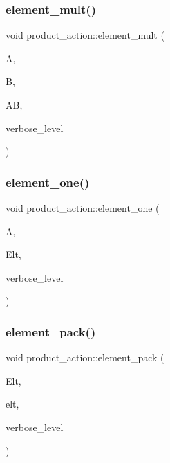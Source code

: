 \subsubsection{\texorpdfstring{element\+\_\+mult()}{element\_mult()}}
{\footnotesize\ttfamily void product\+\_\+action\+::element\+\_\+mult (\begin{DoxyParamCaption}\item[{\mbox{\hyperlink{galois_8h_a09fddde158a3a20bd2dcadb609de11dc}{I\+NT}} $\ast$}]{A,  }\item[{\mbox{\hyperlink{galois_8h_a09fddde158a3a20bd2dcadb609de11dc}{I\+NT}} $\ast$}]{B,  }\item[{\mbox{\hyperlink{galois_8h_a09fddde158a3a20bd2dcadb609de11dc}{I\+NT}} $\ast$}]{AB,  }\item[{\mbox{\hyperlink{galois_8h_a09fddde158a3a20bd2dcadb609de11dc}{I\+NT}}}]{verbose\+\_\+level }\end{DoxyParamCaption})}

\mbox{\label{classproduct__action_a3b367662c854bb83763d5347c193f203}} 
\subsubsection{\texorpdfstring{element\+\_\+one()}{element\_one()}}
{\footnotesize\ttfamily void product\+\_\+action\+::element\+\_\+one (\begin{DoxyParamCaption}\item[{\mbox{\hyperlink{classaction}{action}} $\ast$}]{A,  }\item[{\mbox{\hyperlink{galois_8h_a09fddde158a3a20bd2dcadb609de11dc}{I\+NT}} $\ast$}]{Elt,  }\item[{\mbox{\hyperlink{galois_8h_a09fddde158a3a20bd2dcadb609de11dc}{I\+NT}}}]{verbose\+\_\+level }\end{DoxyParamCaption})}

\mbox{\label{classproduct__action_aa8d2b4985e4ffdec180f8617ddc5fa9a}} 
\subsubsection{\texorpdfstring{element\+\_\+pack()}{element\_pack()}}
{\footnotesize\ttfamily void product\+\_\+action\+::element\+\_\+pack (\begin{DoxyParamCaption}\item[{\mbox{\hyperlink{galois_8h_a09fddde158a3a20bd2dcadb609de11dc}{I\+NT}} $\ast$}]{Elt,  }\item[{\mbox{\hyperlink{galois_8h_a122c4acf389c050379f00341fdcd5812}{U\+B\+Y\+TE}} $\ast$}]{elt,  }\item[{\mbox{\hyperlink{galois_8h_a09fddde158a3a20bd2dcadb609de11dc}{I\+NT}}}]{verbose\+\_\+level }\end{DoxyParamCaption})}

